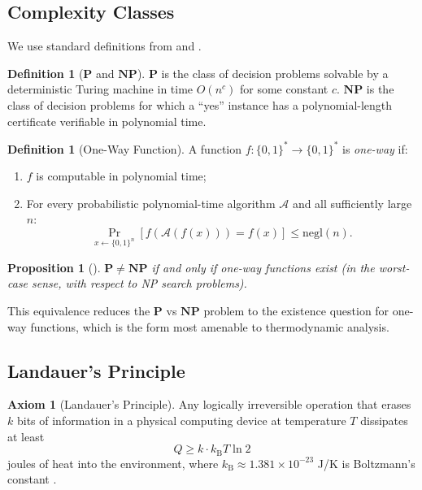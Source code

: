 \documentclass[12pt, a4paper]{article}
\newcommand{\Pc}{\mathbf{P}}
\newcommand{\NPc}{\mathbf{NP}}
\newcommand{\kB}{k_{\text{B}}}
\newcommand{\negl}{\text{negl}}
\theoremstyle{plain}
\newtheorem{proposition}[theorem]{Proposition}
\theoremstyle{definition}
\newtheorem{definition}[theorem]{Definition}
\newtheorem{axiom}[theorem]{Axiom}
\theoremstyle{remark}
\begin{document}
\subsection{Complexity Classes}

We use standard definitions from \citet{AroraBarakBook} and \citet{Sipser2013}.

\begin{definition}[$\Pc$ and $\NPc$]
  $\Pc$ is the class of decision problems solvable by a deterministic
  Turing machine in time $O(n^c)$ for some constant $c$.
  $\NPc$ is the class of decision problems for which
  a ``yes'' instance has a polynomial-length certificate verifiable in
  polynomial time.
\end{definition}

\begin{definition}[One-Way Function]\label{def:owf}
  A function $f: \{0,1\}^* \to \{0,1\}^*$ is \emph{one-way} if:
  \begin{enumerate}[label=(\roman*)]
    \item $f$ is computable in polynomial time;
    \item For every probabilistic polynomial-time algorithm $\mathcal{A}$
      and all sufficiently large $n$:
      \begin{equation}\label{eq:owf}
        \Pr_{x \leftarrow \{0,1\}^n}\left[f(\mathcal{A}(f(x))) = f(x)\right]
        \leq \negl(n).
      \end{equation}
  \end{enumerate}
\end{definition}

\begin{proposition}[\citet{CookStatement}]\label{prop:owf_equiv}
  $\Pc \neq \NPc$ if and only if one-way functions exist (in the
  worst-case sense, with respect to NP search problems).
\end{proposition}

This equivalence reduces the $\Pc$ vs $\NPc$ problem to the existence
question for one-way functions, which is the form most amenable to
thermodynamic analysis.

\subsection{Landauer's Principle}

\begin{axiom}[Landauer's Principle]\label{ax:landauer}
  Any logically irreversible operation that erases $k$ bits of information
  in a physical computing device at temperature $T$ dissipates at least
  \begin{equation}\label{eq:landauer}
    Q \geq k \cdot \kB T \ln 2
  \end{equation}
  joules of heat into the environment, where $\kB \approx 1.381 \times
  10^{-23}$ J/K is Boltzmann's constant \citep{Landauer1961}.
\end{axiom}
\end{document}

